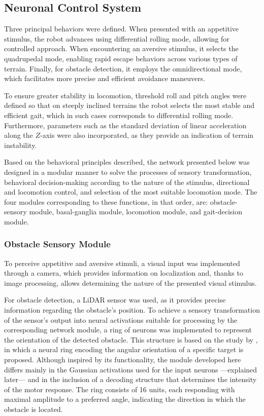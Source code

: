 \documentclass[preprint,12pt]{elsarticle}
\begin{document}
\subsection{Neuronal Control System}

Three principal behaviors were defined. When presented with an appetitive stimulus, the robot advances using differential rolling mode, allowing for controlled approach. When encountering an aversive stimulus, it selects the quadrupedal mode, enabling rapid escape behaviors across various types of terrain. Finally, for obstacle detection, it employs the omnidirectional mode, which facilitates more precise and efficient avoidance maneuvers. 

To ensure greater stability in locomotion, threshold roll and pitch angles were defined so that on steeply inclined terrains the robot selects the most stable and efficient gait, which in such cases corresponds to differential rolling mode. Furthermore, parameters such as the standard deviation of linear acceleration along the $Z$-axis were also incorporated, as they provide an indication of terrain instability.  

Based on the behavioral principles described, the network presented below was designed in a modular manner to solve the processes of sensory transformation, behavioral decision-making according to the nature of the stimulus, directional and locomotion control, and selection of the most suitable locomotion mode. The four modules corresponding to these functions, in that order, are: obstacle-sensory module, basal-ganglia module, locomotion module, and gait-decision module. 

\subsubsection{Obstacle Sensory Module}

To perceive appetitive and aversive stimuli, a visual input was implemented through a camera, which provides information on localization and, thanks to image processing, allows determining the nature of the presented visual stimulus. 

For obstacle detection, a LiDAR sensor was used, as it provides precise information regarding the obstacle’s position. To achieve a sensory transformation of the sensor’s output into neural activations suitable for processing by the corresponding network module, a ring of neurons was implemented to represent the orientation of the detected obstacle. This structure is based on the study by \citet{pardo2022bio}, in which a neural ring encoding the angular orientation of a specific target is proposed. Although inspired by its functionality, the module developed here differs mainly in the Gaussian activations used for the input neurons ---explained later--- and in the inclusion of a decoding structure that determines the intensity of the motor response. The ring consists of 16 units, each responding with maximal amplitude to a preferred angle, indicating the direction in which the obstacle is located.
\end{document}
